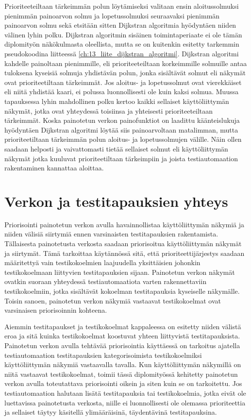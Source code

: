   Prioriteeteiltaan tärkeimmän polun löytämiseksi valitaan ensin aloitussolmuksi pienimmän painoarvon solmu ja lopetussolmuksi seuraavaksi pienimmän painoarvon solmu sekä etsitään sitten Dijkstran algoritmia hyödyntäen niiden välinen lyhin polku.
  Dijkstran algoritmin sisäinen toimintaperiaate ei ole tämän diplomityön näkökulmasta oleellista, mutta se on kuitenkin esitetty tarkemmin pseudokoodina liitteessä \ref{ch:13_liite_dijkstran_algoritmi}.
  Dijkstran algoritmi kahdelle painoltaan pienimmille, eli prioriteeteiltaan korkeimmille solmuille antaa tuloksena kyseisiä solmuja yhdistävän polun, jonka sisältävät solmut eli näkymät ovat prioriteetiltaan tärkeimmät.
  Jos aloitus- ja lopetussolmut ovat vierekkäiset eli niitä yhdistää kaari, ei polussa luonnollisesti ole kuin kaksi solmua.
  Muussa tapauksessa lyhin mahdollinen polku kertoo kaikki sellaiset käyttöliittymän näkymät, jotka ovat yhteydessä toisiinsa ja yhteisesti prioriteeteiltaan tärkeimmät.
  Koska painotetun verkon painofunktiot on laadittu käänteislukuja hyödyntäen Dijkstran algoritmi löytää siis painoarvoltaan matalimman, mutta prioriteetiltaan tärkeimmän polun aloitus- ja lopetussolmujen välille.
  Näin ollen saadaan helposti ja vaivattomasti tietää sellaiset solmut eli käyttöliittymän näkymät jotka kuuluvat prioriteetiltaan tärkeimpiin ja joista testiautomaation rakentaminen kannattaa aloittaa.

\section{Verkon ja testitapauksien yhteys} \label{ch:10_verkon_ja_testitapauksien_yhteys}

  Priorisointi painotetun verkon avulla havainnollistaa käyttöliittymän näkymiä ja niiden välisiä siirtymiä ennen varsinaisten testitapauksien rakentamista.
  Tällaisesta painotetusta verkosta saadaan priorisoitua käyttöliittymän näkymät ja siirtymät.
  Tämä tarkoittaa käytännössä sitä, että prioriteettijärjestys saadaan määritettyä vain testikokoelmien laajuudella yksittäisien johonkin testikokoelmaan liittyvien testitapauksien sijaan.
  Painotetun verkon näkymät ovatkin suoraan yhteydessä testiautomaatiota varten rakennettaviin testikokoelmiin, jotka sisältävät kokoelman testitapauksia kyseiselle näkymälle.
  Toisin sanoen, painotetun verkon näkymiä vastaavat testikokoelmat ovat varsinaisen priorisoinnin kohteena.

  Aiemmin testitapaukset ja testikokoelmat kappaleessa on esitetty niiden välistä eroa ja sitä kuinka testikokoelmat koostuvat yhteen liittyvistä testitapauksista.
  Painotetun verkon avulla tehtävää priorisointia käyttäessä on tarkoitus ajatella testiautomaation testitapauksien kategorisoimista testikokoelmiksi käyttöliittymän näkymiä vastaavalla tavalla.
  Kun käyttöliittymän näkymillä on niitä vastaavat testikokoelmat, toimii tässä diplomityössä kehitetty painotetun verkon avulla toteutattava priorisointi oikein ja siten kuin se on tarkoitettu.
  Jos testiautomaation halutaan lisätä testitapauksia tai testikokoelmia, jotka eivät ole luettavissa painotetusta verkosta, niille ei luonnollisesti ole olemassa prioriteettia ja sellaiset täytyy käsitellä ylimääräisinä, täydentävinä testitapauksina.

